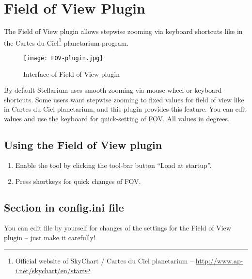 \newpage
\section{Field of View Plugin}
\label{sec:plugins:FieldOfView}
The Field of View plugin allows stepwise zooming via keyboard shortcuts like in the Cartes du Ciel\footnote{Official website of SkyChart / Cartes du Ciel planetarium -- \url{http://www.ap-i.net/skychart/en/start}} planetarium program.

\begin{figure}[h]
\texttt{[image: FOV-plugin.jpg]}
\label{fig:FieldOfView}
\caption{Interface of Field of View plugin}
\end{figure}

By default Stellarium uses smooth zooming via mouse wheel or keyboard shortcuts. Some users want stepwise zooming to fixed values for field of view like in Cartes du Ciel planetarium, and this plugin provides this feature. You can edit values and use the keyboard for quick-setting of FOV. All values in degrees.

\subsection{Using the Field of View plugin}
\label{sec:plugins:FieldOfView:using}

\begin{enumerate}
\item Enable the tool by clicking the tool-bar button ``Load at startup''.
\item Press shortkeys for quick changes of FOV.
\end{enumerate}

\subsection{Section  in config.ini file}
\label{sec:plugins:FieldOfView:config}

You can edit  file by yourself for changes of the
settings for the Field of View plugin -- just make it carefully!

